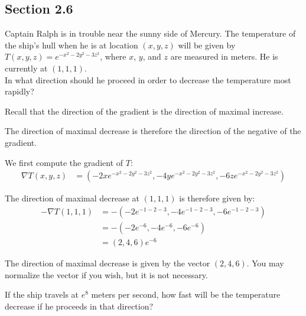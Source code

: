 \subsection{Section 2.6}

\begin{tcolorbox}[
        title={Problem 22 (a)},
        valign=center,
        nobeforeafter,
        colframe=gray!95!black
    ]
Captain Ralph is in trouble near the sunny side of Mercury. The temperature of the ship's hull when he is at location \((x, y, z)\) will be given by \(T(x, y, z) = e^{-x^2 - 2y^2 - 3z^2}\), where \(x\), \(y\), and \(z\) are measured in meters. He is currently at \((1, 1, 1)\). \\

In what direction should he proceed in order to
decrease the temperature most rapidly?
\end{tcolorbox}

\begin{solution}
    Recall that the direction of the gradient is the direction of maximal increase.
    
    The direction of maximal decrease is therefore the direction of the negative of the gradient.
    
    We first compute the gradient of \(T\):
    \begin{align}
        \nabla T(x, y, z) &= \left(-2xe^{-x^2 - 2y^2 - 3z^2}, -4ye^{-x^2 - 2y^2 - 3z^2}, -6ze^{-x^2 - 2y^2 - 3z^2}\right)
    \end{align}
    
    The direction of maximal decrease at \((1, 1, 1)\) is therefore given by:
    \begin{align*}
        -\nabla T(1, 1, 1) &= -\left(-2e^{-1 - 2 - 3}, -4e^{-1 - 2 - 3}, -6e^{-1 - 2 - 3}\right) \\
        &= -\left(-2e^{-6}, -4e^{-6}, -6e^{-6}\right) \\
        &= \left(2, 4, 6\right)e^{-6}
    \end{align*}
    
    The direction of maximal decrease is given by the vector \((2, 4, 6)\). You may normalize the vector if you wish, but it is not necessary.
\end{solution}

\begin{tcolorbox}[
        title={Problem 22 (b)},
        valign=center,
        nobeforeafter,
        colframe=gray!95!black
    ]
If the ship travels at \(e^8\) meters per second, how fast
will be the temperature decrease if he proceeds in
that direction?
\end{tcolorbox}

